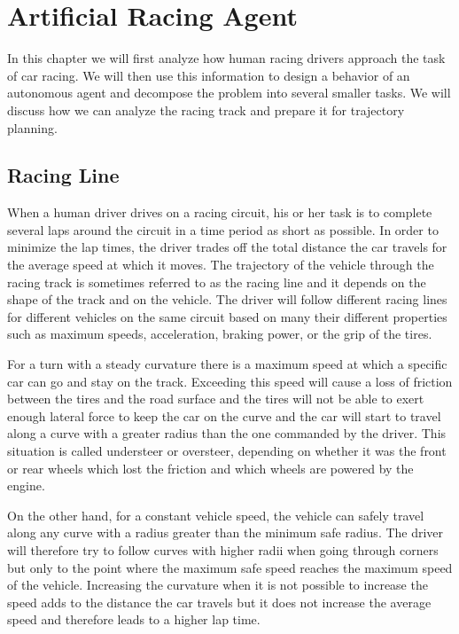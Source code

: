 \chapter{Artificial Racing Agent}
\label{chapter:agent}

In this chapter we will first analyze how human racing drivers approach the task of car racing. We will then use this information to design a behavior of an autonomous agent and decompose the problem into several smaller tasks. We will discuss how we can analyze the racing track and prepare it for trajectory planning.

\section{Racing Line}

When a human driver drives on a racing circuit, his or her task is to complete several laps around the circuit in a time period as short as possible. In order to minimize the lap times, the driver trades off the total distance the car travels for the average speed at which it moves. The trajectory of the vehicle through the racing track is sometimes referred to as the racing line and it depends on the shape of the track and on the vehicle. The driver will follow different racing lines for different vehicles on the same circuit based on many their different properties such as maximum speeds, acceleration, braking power, or the grip of the tires.

For a turn with a steady curvature there is a maximum speed at which a specific car can go and stay on the track. Exceeding this speed will cause a loss of friction between the tires and the road surface and the tires will not be able to exert enough lateral force to keep the car on the curve and the car will start to travel along a curve with a greater radius than the one commanded by the driver. This situation is called understeer or oversteer, depending on whether it was the front or rear wheels which lost the friction and which wheels are powered by the engine.


On the other hand, for a constant vehicle speed, the vehicle can safely travel along any curve with a radius greater than the minimum safe radius. The driver will therefore try to follow curves with higher radii when going through corners but only to the point where the maximum safe speed reaches the maximum speed of the vehicle. Increasing the curvature when it is not possible to increase the speed adds to the distance the car travels but it does not increase the average speed and therefore leads to a higher lap time.

